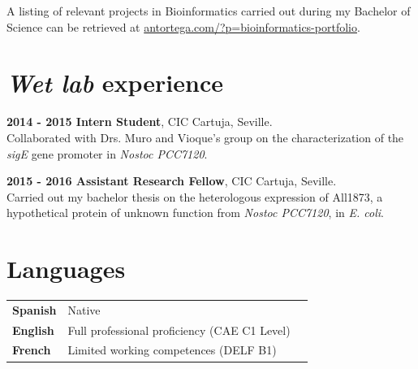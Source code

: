 \documentclass[letterpaper]{article}
\renewenvironment{itemize}{
  \begin{list}{}{
    \setlength{\leftmargin}{1em}
  }
}{
  \end{list}
}
\begin{document}
\begin{itemize}

\item A listing of relevant projects in Bioinformatics carried out during my Bachelor of Science can be retrieved at \href{antortega.com/?p=bioinformatics-portfolio}{antortega.com/?p=bioinformatics-portfolio}.

\end{itemize}




\section*{\textit{Wet lab} experience}


\begin{itemize}

\item \textbf{2014 - 2015 Intern Student}, CIC Cartuja, Seville. \\
Collaborated with Drs. Muro and Vioque's group on the characterization of the \textit{sigE} gene promoter in \textit{Nostoc PCC7120}.

\item \textbf{2015 - 2016 Assistant Research Fellow}, CIC Cartuja, Seville. \\
Carried out my bachelor thesis on the heterologous expression of All1873, a hypothetical protein of unknown function from \textit{Nostoc PCC7120}, in \textit{E. coli}.

\end{itemize}



\section*{Languages}

\renewcommand{\arraystretch}{1.5}

\vspace{-0.5cm}

\begin{table}[!h]

\begin{centering}
\begin{longtable}{>{\bfseries}l l p{4.5in}}

Spanish & Native & \\

English & Full professional proficiency (CAE C1 Level)\\

French & Limited working competences (DELF B1) \\

\end{longtable}
\end{centering}
\end{table}
\end{document}
